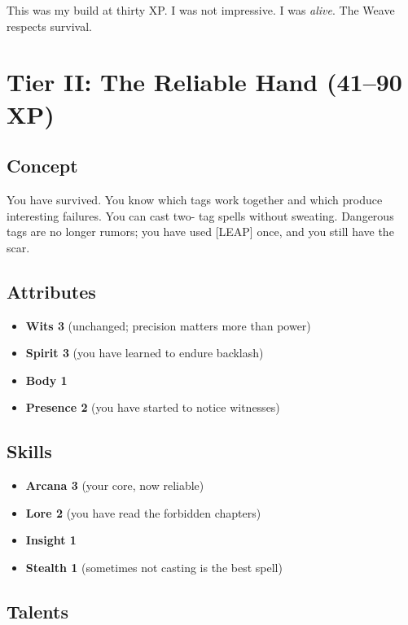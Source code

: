 This was my build at thirty XP. I was not impressive. I was \emph{alive}. The Weave respects survival.

\section{Tier II: The Reliable Hand (41--90 XP)}

\subsection{Concept}

You have survived. You know which tags work together and which produce interesting failures. You can cast two- tag spells without sweating. Dangerous tags are no longer rumors; you have used [LEAP] once, and you still have the scar.

\subsection{Attributes}

\begin{itemize}
    \item \textbf{Wits 3} (unchanged; precision matters more than power)
    \item \textbf{Spirit 3} (you have learned to endure backlash)
    \item \textbf{Body 1}
    \item \textbf{Presence 2} (you have started to notice witnesses)
\end{itemize}

\subsection{Skills}

\begin{itemize}
    \item \textbf{Arcana 3} (your core, now reliable)
    \item \textbf{Lore 2} (you have read the forbidden chapters)
    \item \textbf{Insight 1}
    \item \textbf{Stealth 1} (sometimes not casting is the best spell)
\end{itemize}

\subsection{Talents}

